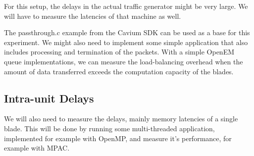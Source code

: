 For this setup, the delays in the actual traffic generator might be very large. We will have to measure the latencies of that machine as well.

The passthrough.c example from the Cavium SDK can be used as a base for this experiment. We might also need to implement some simple application that also includes processing and termination of the packets. With a simple OpenEM queue implementations, we can measure the load-balancing overhead when the amount of data transferred exceeds the computation capacity of the blades.

\subsection{Intra-unit Delays}
We will also need to measure the delays, mainly memory latencies of a single blade. This will be done by running some multi-threaded application, implemented for example with OpenMP, and measure it's performance, for example with MPAC.

